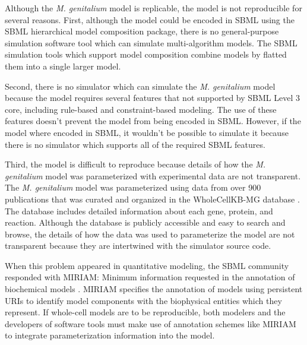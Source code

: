 \documentclass[journal,transmag,twoside]{IEEEtran}
\newcommand{\karrcomment}[2]{\pdfmarkupcomment[markup=Highlight,color=yellow,author={Jonathan Karr}]{#1}{#2}}
\begin{document}
Although the \textit{M. genitalium} model is replicable, the model is not reproducible for several reasons. First,
although the model could be encoded in SBML using the SBML hierarchical model composition package, there is no 
general-purpose simulation software tool which can simulate multi-algorithm models. The SBML simulation tools which support
model composition combine models by flatted them into a single larger model.

Second, there is no simulator which can simulate the \textit{M. genitalium} model because the model requires several features 
that not supported by SBML Level 3 core, including rule-based and constraint-based modeling.
The use of these features doesn't prevent the model from being encoded in SBML. However, if the model where encoded in SBML,
it wouldn't be possible to simulate it because there is no simulator which supports all of the
required SBML features.

Third, the model is difficult to reproduce because details of how the \textit{M. genitalium} model was parameterized with
experimental data are not transparent. The \textit{M. genitalium} model was parameterized using data from over 900 
publications that was curated and organized in the WholeCellKB-MG database \cite{karr2013wholecellkb}. The database 
includes detailed information about each gene, protein, and reaction. Although the database is publicly accessible and
easy to search and browse, the details of how the data was used to parameterize the model are not transparent 
because they are intertwined with the simulator source code.

When this problem appeared in quantitative modeling, the SBML community responded with MIRIAM:
Minimum information requested in the annotation of biochemical models \cite{novere2005minimum}.
MIRIAM specifies the annotation of models using persistent URIs to identify model
components with the biophysical entities which they represent.
If whole-cell models are to be reproducible, both modelers and the developers of software tools
must make use of annotation schemes like MIRIAM to integrate parameterization information into the model.

\end{document}
